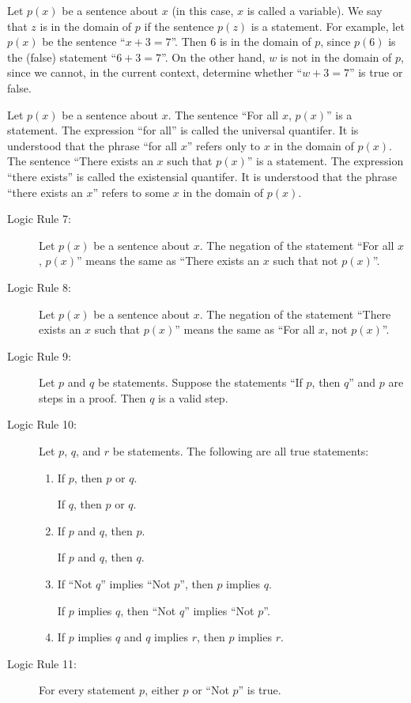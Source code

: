 \documentclass{article}
\begin{document}
Let $p(x)$ be a sentence about $x$ (in this case, $x$ is called a variable). We say that $z$ is in the domain of $p$ if the sentence $p(z)$ is a statement. For example, let $p(x)$ be the sentence ``$x+3=7$''. Then $6$ is in the domain of $p$, since $p(6)$ is the (false) statement ``$6+3=7$''. On the other hand, $w$ is not in the domain of $p$, since we cannot, in the current context, determine whether ``$w+3=7$'' is true or false.

Let $p(x)$ be a sentence about $x$. The sentence ``For all $x$, $p(x)$'' is a statement. The expression ``for all'' is called the universal quantifer. It is understood that the phrase ``for all $x$'' refers only to $x$ in the domain of $p(x).$ The sentence ``There exists an $x$ such that $p(x)$'' is a statement. The expression ``there exists'' is called the existensial quantifer. It is understood that the phrase ``there exists an $x$'' refers to some $x$ in the domain of $p(x)$.

\begin{description}

\item[Logic Rule 7:] Let $p(x)$ be a sentence about $x$. The negation of the statement ``For all $x$, $p(x)$'' means the same as ``There exists an $x$ such that not $p(x)$''.

\item[Logic Rule 8:] Let $p(x)$ be a sentence about $x$. The negation of the statement ``There exists an $x$ such that $p(x)$'' means the same as ``For all $x$, not $p(x)$''.

\item[Logic Rule 9:] Let $p$ and $q$ be statements. Suppose the statements ``If $p$, then $q$'' and $p$ are steps in a proof. Then $q$ is a valid step.

\item[Logic Rule 10:] Let $p$, $q$, and $r$ be statements. The following are all true statements:
\begin{enumerate}[\hspace{1cm}1.]
  \item If $p$, then $p$ or $q$.

      If $q$, then $p$ or $q$.
  \item If $p$ and $q$, then $p$.

      If $p$ and $q$, then $q$.
  \item If ``Not $q$'' implies ``Not $p$'', then $p$ implies $q$.

      If $p$ implies $q$, then ``Not $q$'' implies ``Not $p$''.
  \item If $p$ implies $q$ and $q$ implies $r$, then $p$ implies $r$.
\end{enumerate}

\item[Logic Rule 11:] For every statement $p$, either $p$ or ``Not $p$'' is true.

\end{description}
\end{document}
